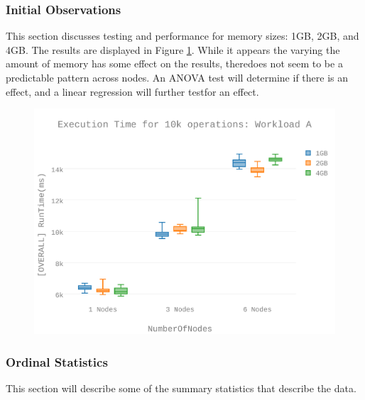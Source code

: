 \subsubsection{Initial Observations}
This section discusses testing and performance for memory sizes: 1GB, 2GB, and 4GB.  The results are displayed in Figure \ref{figures-wlc_fig4}. While it appears the varying the amount of memory has some effect on the results, theredoes not seem to be a predictable pattern across nodes. An ANOVA test will determine if there is an effect, and a linear regression will further testfor an effect. \begin{figure}[h]
\includegraphics[width=5.5in]{Figures/figures-wlc_fig4.pdf}
\caption{}
\label{figures-wlc_fig4}
\end{figure}



\subsubsection{Ordinal Statistics}
This section will describe some of the summary statistics that describe the data.  


